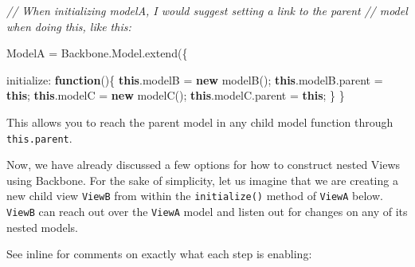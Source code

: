 \documentclass[9pt]{book}
\newenvironment{Shaded}{}{}
\newcommand{\KeywordTok}[1]{\textcolor[rgb]{0.00,0.44,0.13}{\textbf{{#1}}}}
\newcommand{\DataTypeTok}[1]{\textcolor[rgb]{0.56,0.13,0.00}{{#1}}}
\newcommand{\CommentTok}[1]{\textcolor[rgb]{0.38,0.63,0.69}{\textit{{#1}}}}
\newcommand{\OtherTok}[1]{\textcolor[rgb]{0.00,0.44,0.13}{{#1}}}
\newcommand{\FunctionTok}[1]{\textcolor[rgb]{0.02,0.16,0.49}{{#1}}}
\newcommand{\NormalTok}[1]{{#1}}
\begin{document}
\begin{Shaded}
\begin{Highlighting}[]

\CommentTok{// When initializing modelA, I would suggest setting a link to the parent}
\CommentTok{// model when doing this, like this:}

\NormalTok{ModelA = }\OtherTok{Backbone}\NormalTok{.}\OtherTok{Model}\NormalTok{.}\FunctionTok{extend}\NormalTok{(\{}

    \DataTypeTok{initialize}\NormalTok{: }\KeywordTok{function}\NormalTok{()\{}
        \KeywordTok{this}\NormalTok{.}\FunctionTok{modelB} \NormalTok{= }\KeywordTok{new} \FunctionTok{modelB}\NormalTok{();}
        \KeywordTok{this}\NormalTok{.}\OtherTok{modelB}\NormalTok{.}\FunctionTok{parent} \NormalTok{= }\KeywordTok{this}\NormalTok{;}
        \KeywordTok{this}\NormalTok{.}\FunctionTok{modelC} \NormalTok{= }\KeywordTok{new} \FunctionTok{modelC}\NormalTok{();}
        \KeywordTok{this}\NormalTok{.}\OtherTok{modelC}\NormalTok{.}\FunctionTok{parent} \NormalTok{= }\KeywordTok{this}\NormalTok{;}
    \NormalTok{\}}
\NormalTok{\}}
\end{Highlighting}
\end{Shaded}

This allows you to reach the parent model in any child model function
through \texttt{this.parent}.

Now, we have already discussed a few options for how to construct nested
Views using Backbone. For the sake of simplicity, let us imagine that we
are creating a new child view \texttt{ViewB} from within the
\texttt{initialize()} method of \texttt{ViewA} below. \texttt{ViewB} can
reach out over the \texttt{ViewA} model and listen out for changes on
any of its nested models.

See inline for comments on exactly what each step is enabling:
\end{document}
